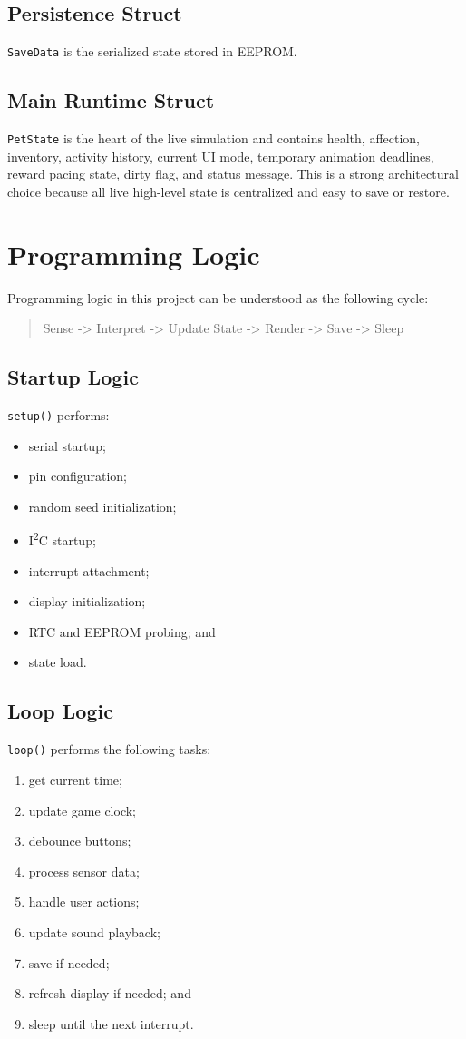 \documentclass[conference]{IEEEtran}
\begin{document}
\subsection{Persistence Struct}
\texttt{SaveData} is the serialized state stored in EEPROM.

\subsection{Main Runtime Struct}
\texttt{PetState} is the heart of the live simulation and contains health, affection, inventory, activity history, current UI mode, temporary animation deadlines, reward pacing state, dirty flag, and status message. This is a strong architectural choice because all live high-level state is centralized and easy to save or restore.

\section{Programming Logic}
Programming logic in this project can be understood as the following cycle:
\begin{quote}
\ttfamily
Sense -> Interpret -> Update State -> Render -> Save -> Sleep
\end{quote}

\subsection{Startup Logic}
\texttt{setup()} performs:
\begin{itemize}
\item serial startup;
\item pin configuration;
\item random seed initialization;
\item I\textsuperscript{2}C startup;
\item interrupt attachment;
\item display initialization;
\item RTC and EEPROM probing; and
\item state load.
\end{itemize}

\subsection{Loop Logic}
\texttt{loop()} performs the following tasks:
\begin{enumerate}
\item get current time;
\item update game clock;
\item debounce buttons;
\item process sensor data;
\item handle user actions;
\item update sound playback;
\item save if needed;
\item refresh display if needed; and
\item sleep until the next interrupt.
\end{enumerate}
\end{document}
